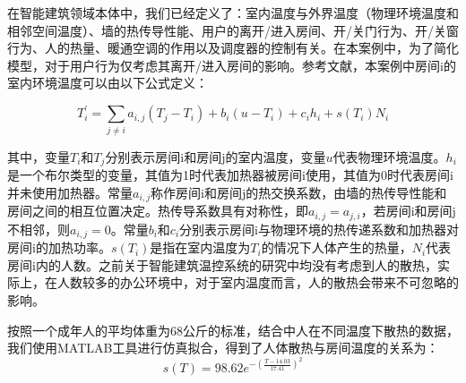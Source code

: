 		
	在智能建筑领域本体中，我们已经定义了：室内温度与外界温度（物理环境温度和相邻空间温度）、墙的热传导性能、用户的离开/进入房间、开/关门行为、开/关窗行为、人的热量、暖通空调的作用以及调度器的控制有关。在本案例中，为了简化模型，对于用户行为仅考虑其离开/进入房间的影响。参考文献\citep{DBLP:conf/hybrid/FehnkerI04}，本案例中房间i的室内环境温度可以由以下公式定义：
	
	\begin{equation}
	T_{i}^{'} = \sum_{j\not=i} a_{i,j}(T_{j}-T_{i})+b_{i}(u-T_{i})+c_{i}h_{i}+s(T_{i})N_{i}
	\label{gongshi}
	\end{equation}
	
	其中，变量$T_{i}$和$T_{j}$分别表示房间i和房间j的室内温度，变量$u$代表物理环境温度。$h_{i}$是一个布尔类型的变量，其值为1时代表加热器被房间i使用，其值为0时代表房间i并未使用加热器。常量$a_{i,j}$称作房间i和房间j的热交换系数，由墙的热传导性能和房间之间的相互位置决定。热传导系数具有对称性，即$a_{i,j}=a_{j,i}$，若房间i和房间j不相邻，则$a_{i,j}=0$。常量$b_{i}$和$c_{i}$分别表示房间i与物理环境的热传递系数和加热器对房间i的加热功率。$s(T_{i})$是指在室内温度为$T_{i}$的情况下人体产生的热量，$N_{i}$代表房间i内的人数。之前关于智能建筑温控系统的研究中均没有考虑到人的散热，实际上，在人数较多的办公环境中，对于室内温度而言，人的散热会带来不可忽略的影响。

	按照一个成年人的平均体重为68公斤的标准，结合\citep{CarrierCorporation1965Handbook}中人在不同温度下散热的数据，我们使用MATLAB工具进行仿真拟合，得到了人体散热与房间温度的关系为：
	\begin{equation}
	s(T)=98.62e^{-(\frac{T-14.03}{17.41})^2}
	\end{equation}
	
